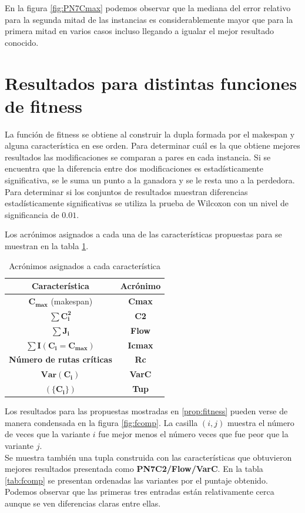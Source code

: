 En la figura \ref{fig:PN7Cmax} podemos observar que la mediana del error relativo para la segunda mitad de las instancias es considerablemente mayor que para la primera mitad en varios casos incluso llegando a igualar el mejor resultado conocido.

\section{Resultados para distintas funciones de fitness}
  La función de fitness se obtiene al construir la dupla formada por el makespan y alguna característica en ese orden. Para determinar cuál es la que obtiene mejores resultados las modificaciones se comparan a pares en cada instancia. Si se encuentra que la diferencia entre dos modificaciones es estadísticamente significativa, se le suma un punto a la ganadora y se le resta uno a la perdedora.
Para determinar si los conjuntos de resultados muestran diferencias estadísticamente significativas se utiliza la prueba de Wilcoxon con un nivel de significancia de $0.01$. 

Los acrónimos asignados a cada una de las características propuestas para se muestran en la tabla \ref{tab:caracter}.
\begin{table}[hbtp]
    \centering
\begin{tabular}{@{}cc@{}}
Característica                    & Acrónimo       \\ \hline \hline
$\mathbf{C_{max}}$ (makespan)     & \textbf{Cmax}   \\\midrule
$\mathbf{\sum C_i^2}$             & \textbf{C2}    \\\midrule
$\mathbf{\sum J_i}$               & \textbf{Flow}  \\\midrule
$\mathbf{\sum I(C_i=C_{max})}$    & \textbf{Icmax} \\\midrule
\textbf{Número de rutas críticas} & \textbf{Rc}    \\\midrule
$\mathbf{Var(C_i)}$               & \textbf{VarC}  \\\midrule
$\mathbf{(\{C_i\})}$              & \textbf{Tup}    \\\midrule
\end{tabular}
    \caption{Acrónimos asignados a cada característica}
    \label{tab:caracter}
\end{table}

Los resultados para las propuestas mostradas en \ref{prop:fitness} pueden verse de manera condensada en la figura \ref{fig:fcomp}. La casilla $(i,j)$ muestra el número de veces que la variante $i$ fue mejor menos el número veces que fue peor que la variante $j$.\\
Se muestra también una tupla construida con las características que obtuvieron mejores resultados presentada como \textbf{PN7C2/Flow/VarC}. En la tabla \ref{tab:fcomp} se presentan ordenadas las variantes por el puntaje obtenido. Podemos observar que las primeras tres entradas están relativamente cerca aunque se ven diferencias claras entre ellas.\\

